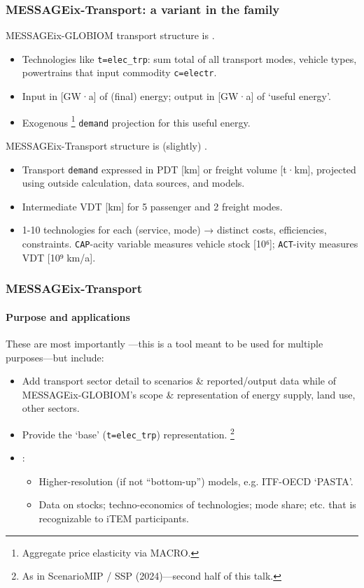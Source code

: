 \documentclass[12pt,aspectratio=169]{beamer}
\begin{document}
\begin{frame}
\frametitle{MESSAGEix-Transport: a variant in the family}

MESSAGEix-GLOBIOM transport structure is .
\begin{itemize}
  \item Technologies like \texttt{t=elec\_trp}: sum total of all transport modes, vehicle types, powertrains that input commodity \texttt{c=electr}.
  \item Input in [GW·a] of (final) energy; output in [GW·a] of ‘useful energy’.
  \item Exogenous%
  \footnote{Aggregate price elasticity via MACRO.}
  \texttt{demand} projection for this useful energy.
\end{itemize}

MESSAGEix-Transport structure is (slightly) .
\begin{itemize}
  \item Transport \texttt{demand} expressed in PDT [km] or freight volume [t·km], projected using outside calculation, data sources, and models.
  \item Intermediate VDT [km] for 5 passenger and 2 freight modes.
  \item 1-10 technologies for each (service, mode) → distinct costs, efficiencies, constraints. \texttt{CAP}-acity variable measures vehicle stock [10⁶]; \texttt{ACT}-ivity measures VDT [10⁹ km/a].
\end{itemize}
\end{frame}

\begin{frame}
\frametitle{MESSAGEix-Transport}
\framesubtitle{Purpose and applications}

These are most importantly —this is a tool meant to be used for multiple purposes—but include:
\begin{itemize}
  \item Add transport sector detail to scenarios \& reported/output data while  of MESSAGEix-GLOBIOM's scope \& representation of energy supply, land use, other sectors.
  \item Provide  the ‘base’ (\texttt{t=elec\_trp}) representation.%
  \footnote{As in ScenarioMIP / SSP (2024)—second half of this talk.}
  \item {}:
  \begin{itemize}
    \item Higher-resolution (if not “bottom-up”) models, e.g. ITF-OECD ‘PASTA’.
    \item Data on stocks; techno-economics of technologies; mode share; etc. that is recognizable to iTEM participants.
  \end{itemize}
\end{itemize}
\end{frame}
\end{document}

